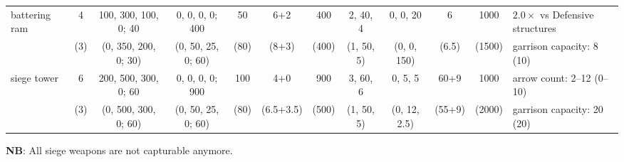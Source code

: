 \documentclass{article}
\begin{document}
\begin{landscape}
\begin{tabular}{l|ccc|cccc|ccc|l}
\hline
battering ram &  4  & 100, 300, 100,   0; 40  &  0,  0,  0,  0; 400  &   50  &    6+2    &  400  &  2, 40, 4  &  0,   0,  20  &      6   &  1000  & $2.0\times$ vs Defensive structures \\
              & (3) &  (0, 350, 200,   0; 30) & (0, 50, 25,  0;  60) &  (80) &   (8+3)   & (400) & (1, 50, 5) & (0,   0, 150) &    (6.5) & (1500) & garrison capacity: 8 (10) \\ 
\hline
siege tower   &  6  & 200, 500, 300,   0; 60  &  0,  0,  0,  0; 900  &  100  &    4+0    &  900  &  3, 60, 6  &  0,   5,   5  &   60+9   &  1000  & arrow count: 2--12 (0--10) \\
              & (3) &  (0, 500, 300,   0; 60) & (0, 50, 25,  0;  60) &  (80) & (6.5+3.5) & (500) & (1, 50, 5) & (0,  12, 2.5) &  (55+9)  & (2000) & garrison capacity: 20 (20) \\
\end{tabular}

\textbf{NB}: All siege weapons are not capturable anymore.



\end{landscape}
\end{document}
